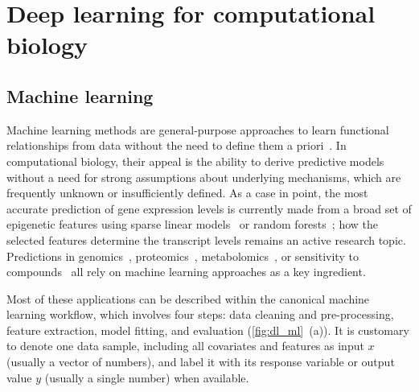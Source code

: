 

\chapter{Deep learning for computational biology}

\ifpdf
    \graphicspath{{Chapter2/Figs/Raster/}{Chapter2/Figs/PDF/}{Chapter2/Figs/}}
\else
    \graphicspath{{Chapter2/Figs/Vector/}{Chapter2/Figs/}}
\fi

\section{Machine learning}
Machine learning methods are general-purpose approaches to learn functional relationships from data without the need to define them a priori~\citep{hastie_elements_2005,michalski_machine_2013,murphy_machine_2012}. In computational biology, their appeal is the ability to derive predictive models without a need for strong assumptions about underlying mechanisms, which are frequently unknown or insufficiently defined. As a case in point, the most accurate prediction of gene expression levels is currently made from a broad set of epigenetic features using sparse linear models~\citep{cheng_statistical_2011,karlic_histone_2010} or random forests~\citep{li_using_2015}; how the selected features determine the transcript levels remains an active research topic. Predictions in genomics~\citep{libbrecht_machine_2015,martens_predicting_2016}, proteomics~\citep{swan_application_2013}, metabolomics~\citep{kell_metabolomics_2005}, or sensitivity to compounds~\citep{eduati_prediction_2015} all rely on machine learning approaches as a key ingredient.

Most of these applications can be described within the canonical machine learning workflow, which involves four steps: data cleaning and pre-processing, feature extraction, model fitting, and evaluation (\autoref{fig:dl_ml}~(a)). It is customary to denote one data sample, including all covariates and features as input $x$ (usually a vector of numbers), and label it with its response variable or output value $y$ (usually a single number) when available.

